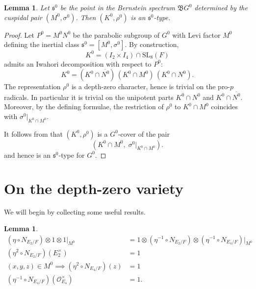 \documentclass[11pt]{amsart}
\newtheorem{lemma}[theorem]{Lemma}
\theoremstyle{remark}
\theoremstyle{definition}
\newcommand{\Z}{\mathbb{Z}}
\newcommand{\SL}{\mathrm{SL}}
\newcommand{\fs}{\mathfrak{s}}
\begin{document}




\begin{lemma}  Let $\fs^0$ be the point in the Bernstein spectrum $\mathfrak{B}G^0$ determined by the  cuspidal pair $(M^0, \sigma^0)$.   Then $(K^0, \rho^0)$ is an $\fs^0$-type.  
\end{lemma}

 \begin{proof}
Let $P^0=M^0N^0$ be the parabolic subgroup of $G^0$ with Levi factor $M^0$ defining the inertial
class $\fs^0=[M^0,\sigma^0]$.  By construction,
\[
K^0=(I_2\times I_4)\cap \SL_8(F)
\]
admits an Iwahori decomposition with respect to $P^0$:
\[
K^0=(K^0\cap \overline{N^0})\,(K^0\cap M^0)\,(K^0\cap N^0).
\]
The representation $\rho^0$ is a depth-zero character, hence is trivial on the pro-$p$ radicals.
In particular it is trivial on the unipotent parts $K^0\cap N^0$ and $K^0\cap \overline{N^0}$.
Moreover, by the defining formulae, the restriction of $\rho^0$ to $K^0\cap M^0$ coincides with
$\sigma^0|_{K^0\cap M^0}$.

It follows from \cite[\S 4.9]{Mo} that $(K^0,\rho^0)$ is a $G^0$-cover of the pair \[(K^0\cap M^0,\;\sigma^0|_{K^0\cap M^0}).\] 
and hence is an $\fs^0$-type for $G^0$.\end{proof}

\section{On the depth-zero variety}

We will begin by collecting some useful results.

\begin{lemma}\label{etas}
\begin{align}
(\eta \circ N_{E_2/F}) \otimes 1 \otimes 1|_{M^0} &= 1 \otimes (\eta^{-1} \circ N_{E_2/F})  \otimes (\eta^{-1} \circ N_{E_4/F})|_{M^0}\\
(\eta^2 \circ N_{E_2/F})(E_2^\times) & = 1\\
(x,y,z) \in M^0  \implies (\eta^2 \circ N_{E_4/F}) (z) &= 1\\
(\eta^{-1} \circ N_{E_4/F})(\mathcal{O}^\times_{E_4}) & = 1. 
\end{align}
\end{lemma}
\end{document}
